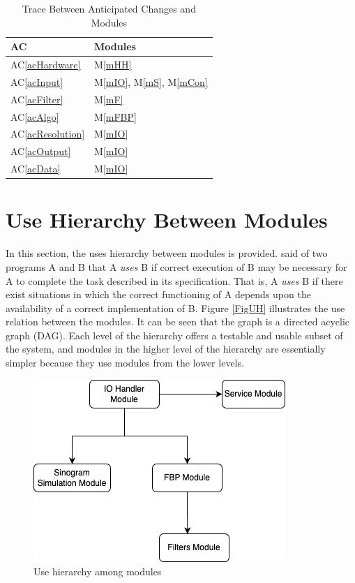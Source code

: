 \documentclass[12pt, titlepage]{article}
\newcommand{\acref}[1]{AC\ref{#1}}
\newcommand{\mref}[1]{M\ref{#1}}
\begin{document}
\begin{table}[H]
\centering
\begin{tabular}{p{} p{}}
\toprule
\textbf{AC} & \textbf{Modules}\\
\midrule
\acref{acHardware} & \mref{mHH}\\
\acref{acInput} & \mref{mIO}, \mref{mS}, \mref{mCon}\\
\acref{acFilter} & \mref{mF}\\
\acref{acAlgo} & \mref{mFBP}\\
\acref{acResolution} & \mref{mIO}\\
\acref{acOutput} & \mref{mIO}\\
\acref{acData} & \mref{mIO}\\
\bottomrule
\end{tabular}
\caption{Trace Between Anticipated Changes and Modules}
\label{TblACT}
\end{table}

\section{Use Hierarchy Between Modules} \label{SecUse}

In this section, the uses hierarchy between modules is
provided. \citet{Parnas1978} said of two programs A and B that A {\em uses} B if
correct execution of B may be necessary for A to complete the task described in
its specification. That is, A {\em uses} B if there exist situations in which
the correct functioning of A depends upon the availability of a correct
implementation of B.  Figure \ref{FigUH} illustrates the use relation between
the modules. It can be seen that the graph is a directed acyclic graph
(DAG). Each level of the hierarchy offers a testable and usable subset of the
system, and modules in the higher level of the hierarchy are essentially simpler
because they use modules from the lower levels.

\begin{cross}
\begin{figure}[H]
\centering
\includegraphics[scale=0.5]{DAG.jpg}
\caption{Use hierarchy among modules}
\end{figure}
\end{cross}
\end{document}
